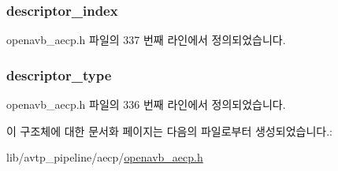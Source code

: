 \subsubsection[{\texorpdfstring{descriptor\+\_\+index}{descriptor_index}}]{ descriptor\+\_\+index}\hypertarget{structopenavb__aecp__response__data__get__counters__t_ab26fb363c24b9a2a4391f9171c981b08}{}\label{structopenavb__aecp__response__data__get__counters__t_ab26fb363c24b9a2a4391f9171c981b08}


openavb\+\_\+aecp.\+h 파일의 337 번째 라인에서 정의되었습니다.

\subsubsection[{\texorpdfstring{descriptor\+\_\+type}{descriptor_type}}]{ descriptor\+\_\+type}\hypertarget{structopenavb__aecp__response__data__get__counters__t_a1e231d7874aada5925b29affc76782cc}{}\label{structopenavb__aecp__response__data__get__counters__t_a1e231d7874aada5925b29affc76782cc}


openavb\+\_\+aecp.\+h 파일의 336 번째 라인에서 정의되었습니다.



이 구조체에 대한 문서화 페이지는 다음의 파일로부터 생성되었습니다.\+:\begin{DoxyCompactItemize}
\item 
lib/avtp\+\_\+pipeline/aecp/\hyperlink{openavb__aecp_8h}{openavb\+\_\+aecp.\+h}\end{DoxyCompactItemize}
